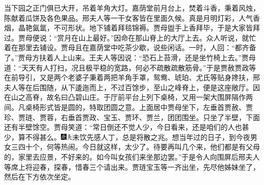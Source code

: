 当下园之正门俱已大开，吊着羊角大灯。嘉荫堂前月台上，焚着斗香，秉着风烛，陈献着瓜饼及各色果品。邢夫人等一干女客皆在里面久候。真是月明灯彩，人气香烟，晶艳氤氲，不可形状。地下铺着拜毯锦褥。贾母盥手上香拜毕，于是大家皆拜过。贾母便说：``赏月在山上最好。''因命在那山脊上的大厅上去。众人听说，就忙着在那里去铺设。贾母且在嘉荫堂中吃茶少歇，说些闲话。一时，人回：``都齐备了。''贾母方扶着人上山来。王夫人等因说：``恐石上苔滑，还是坐竹椅上去。''贾母道：``天天有人打扫，况且极平稳的宽路，何必不疏散疏散筋骨。''于是贾赦贾政等在前导引，又是两个老婆子秉着两把羊角手罩，鸳鸯、琥珀、尤氏等贴身搀扶，邢夫人等在后围随，从下逶迤而上，不过百馀步，至山之峰脊上，便是这座敞厅。因在山之高脊，故名曰凸碧山庄。于厅前平台上列下桌椅，又用一架大围屏隔作两间。凡桌椅形式皆是圆的，特取团圆之意。上面居中贾母坐下，左垂首贾赦、贾珍、贾琏、贾蓉，右垂首贾政、宝玉、贾环、贾兰，团团围坐。只坐了半壁，下面还有半壁馀空。贾母笑道：``常日倒还不觉人少，今日看来，还是咱们的人也甚少，算不得甚么。{\includegraphics[width=3mm]{../Images/00004}\includegraphics[width=3mm]{../Images/00012}\footnotesize \kaishu 未饮先感人丁，总是将散之兆。}想当年过的日子，到今夜男女三四十个，何等热闹。今日就这样，太少了。待要再叫几个来，他们都是有父母的，家里去应景，不好来的。如今叫女孩们来坐那边罢。''于是令人向围屏后邢夫人等席上将迎春，探春，惜春三个请出来。贾琏宝玉等一齐出坐，先尽他姊妹坐了，然后在下方依次坐定。

